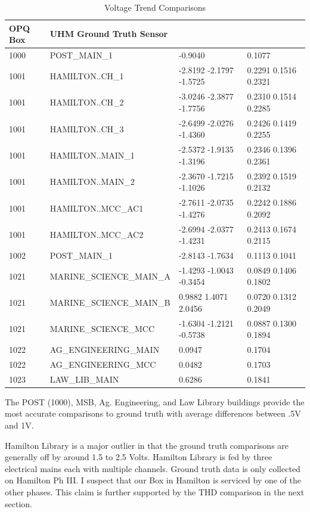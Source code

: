 \begin{table}[H]
    \centering
    \caption{Voltage Trend Comparisons}
    \begin{tabularx}{\textwidth}{lXll}
        \toprule
        \textbf{OPQ Box} & \textbf{UHM Ground Truth Sensor} & \boldmath{$\mu$} & \boldmath{$\sigma$} \\
        \midrule
        1000 & POST\_MAIN\_1 & -0.9040 & 0.1077 \\
        1001 & HAMILTON..CH\_1 & -2.8192 -2.1797 -1.5725 & 0.2291 0.1516 0.2321 \\
        1001 & HAMILTON..CH\_2 & -3.0246 -2.3877 -1.7756 & 0.2310 0.1514 0.2285 \\
        1001 & HAMILTON..CH\_3 & -2.6499 -2.0276 -1.4360 & 0.2426 0.1419 0.2255 \\
        1001 & HAMILTON..MAIN\_1 & -2.5372 -1.9135 -1.3196 & 0.2346 0.1396 0.2361 \\
        1001 & HAMILTON..MAIN\_2 & -2.3670 -1.7215 -1.1026 & 0.2392 0.1519 0.2132 \\
        1001 & HAMILTON..MCC\_AC1 & -2.7611 -2.0735 -1.4276 & 0.2242 0.1886 0.2092 \\
        1001 & HAMILTON..MCC\_AC2 & -2.6994 -2.0377 -1.4231 & 0.2413 0.1674 0.2115 \\
        1002 & POST\_MAIN\_1 & -2.8143 -1.7634 & 0.1113 0.1041 \\
        1021 & MARINE\_SCIENCE\_MAIN\_A & -1.4293 -1.0043 -0.3454 & 0.0849 0.1406 0.1802 \\
        1021 & MARINE\_SCIENCE\_MAIN\_B & 0.9882 1.4071 2.0456 & 0.0720 0.1312 0.2049 \\
        1021 & MARINE\_SCIENCE\_MCC & -1.6304 -1.2121 -0.5738 & 0.0887 0.1300 0.1894 \\
        1022 & AG\_ENGINEERING\_MAIN & 0.0947 & 0.1704 \\
        1022 & AG\_ENGINEERING\_MCC & 0.0482 & 0.1703 \\
        1023 & LAW\_LIB\_MAIN & 0.6286 & 0.1841 \\
        \bottomrule
    \end{tabularx}
    \label{table:gt_v}
\end{table}

The POST (1000), MSB, Ag. Engineering, and Law Library buildings provide the most accurate comparisons to ground truth with average differences between .5V and 1V.

Hamilton Library is a major outlier in that the ground truth comparisons are generally off by around 1.5 to 2.5 Volts. Hamilton Library is fed by three electrical mains each with multiple channels. Ground truth data is only collected on Hamilton Ph III. I suspect that our Box in Hamilton is serviced by one of the other phases. This claim is further supported by the THD comparison in the next section.


